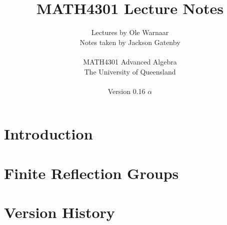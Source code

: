 \documentclass[a4paper]{report}
\title{MATH4301 Lecture Notes}
\author{Lectures by Ole Warnaar\\
Notes taken by Jackson Gatenby\\
\\
MATH4301 Advanced Algebra\\
The University of Queensland\\
\\
Version 0.16 $\alpha$}
\begin{document}
\maketitle
\tableofcontents



\chapter{Introduction}







\chapter{Finite Reflection Groups}









\vspace{1cm}






\appendix

\chapter{Version History}

\end{document}
